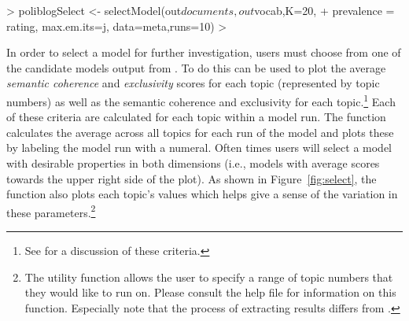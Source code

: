\documentclass[nojss]{jss}
\begin{document}
\begin{Schunk}
\begin{Sinput}
> poliblogSelect <- selectModel(out$documents,out$vocab,K=20,
+         prevalence =~ rating, max.em.its=j, data=meta,runs=10)
> 
\end{Sinput}
\end{Schunk}

In order to select a model for further investigation, users must choose from one of the candidate models output from . To do this  can be used to plot the average \emph{semantic coherence} and \emph{exclusivity} scores for each topic (represented by topic numbers) as well as the semantic coherence and exclusivity for each topic.\footnote{See \citet{STMEdo,ajps} for a discussion of these criteria.} Each of these criteria are calculated for each topic within a model run. The  function calculates the average across all topics for each run of the model and plots these by labeling the model run with a numeral. Often times users will select a model with desirable properties in both dimensions (i.e., models with average scores towards the upper right side of the plot). As shown in Figure~\ref{fig:select}, the  function also plots each topic's values which helps give a sense of the variation in these parameters.\footnote{The utility function  allows the user to specify a range of topic numbers that they would like to run  on. Please consult the help file for information on this function. Especially note that the process of extracting results differs from .}
\end{document}
